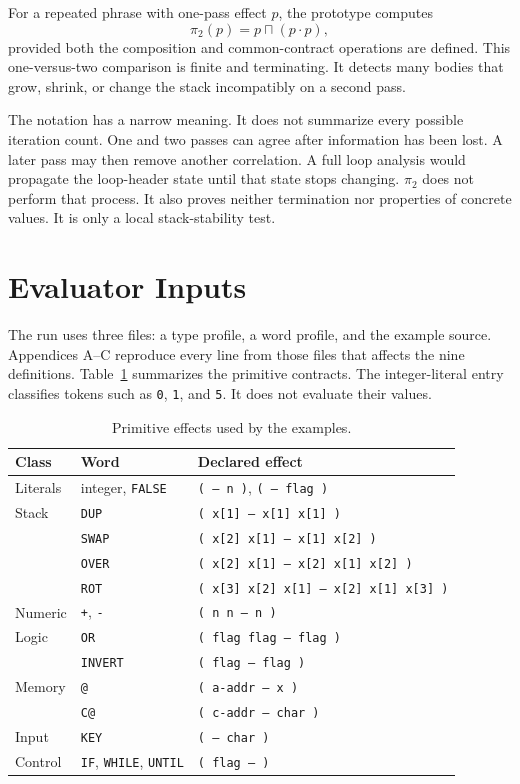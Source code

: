 \documentclass[11pt,a4paper]{article}
\newcommand{\meet}{\mathbin{\sqcap}}
\newcommand{\seq}{\mathbin{\cdot}}
\begin{document}
For a repeated phrase with one-pass effect $p$, the prototype computes
\[
                  \pi_2(p)=p\meet(p\seq p),
\]
provided both the composition and common-contract operations are defined.
This one-versus-two comparison is finite and terminating.  It detects many
bodies that grow, shrink, or change the stack incompatibly on a second pass.

The notation has a narrow meaning.  It does not summarize every possible
iteration count.  One and two passes can agree after information has been
lost.  A later pass may then remove another correlation.  A full loop analysis
would propagate the loop-header state until that state stops changing.
$\pi_2$ does not perform that process.  It also proves neither termination nor
properties of concrete values.  It is only a local stack-stability test.

\section{Evaluator Inputs}
\label{sec:control}

The run uses three files: a type profile, a word profile, and the example
source.  Appendices A--C reproduce every line from those files that affects the
nine definitions.  Table~\ref{tab:primitives} summarizes the primitive
contracts.  The integer-literal entry classifies tokens such as \texttt{0},
\texttt{1}, and \texttt{5}.  It does not evaluate their values.

\clearpage
\begin{table}[h]
\centering
\small
\begin{tabular}{@{}lll@{}}
\hline
Class & Word & Declared effect \\
\hline
Literals & integer, \texttt{FALSE} & \texttt{( -- n )}, \texttt{( -- flag )} \\
Stack & \texttt{DUP} & \texttt{( x[1] -- x[1] x[1] )} \\
      & \texttt{SWAP} & \texttt{( x[2] x[1] -- x[1] x[2] )} \\
      & \texttt{OVER} & \texttt{( x[2] x[1] -- x[2] x[1] x[2] )} \\
      & \texttt{ROT} & \texttt{( x[3] x[2] x[1] -- x[2] x[1] x[3] )} \\
Numeric & \texttt{+}, \texttt{-} & \texttt{( n n -- n )} \\
Logic & \texttt{OR} & \texttt{( flag flag -- flag )} \\
      & \texttt{INVERT} & \texttt{( flag -- flag )} \\
Memory & \texttt{@} & \texttt{( a-addr -- x )} \\
       & \texttt{C@} & \texttt{( c-addr -- char )} \\
Input & \texttt{KEY} & \texttt{( -- char )} \\
Control & \texttt{IF}, \texttt{WHILE}, \texttt{UNTIL}
        & \texttt{( flag -- )} \\
\hline
\end{tabular}
\caption{Primitive effects used by the examples.}
\label{tab:primitives}
\end{table}
\end{document}
